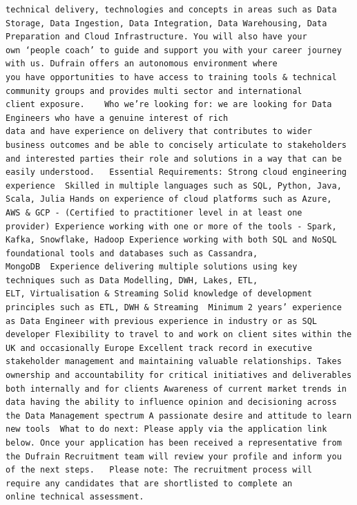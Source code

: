 \documentclass[
]{article}
\begin{document}
\begin{verbatim}
technical delivery, technologies and concepts in areas such as Data Storage, Data Ingestion, Data Integration, Data Warehousing, Data Preparation and Cloud Infrastructure. You will also have your own ‘people coach’ to guide and support you with your career journey with us. Dufrain offers an autonomous environment where you have opportunities to have access to training tools & technical community groups and provides multi sector and international client exposure.    Who we’re looking for: we are looking for Data Engineers who have a genuine interest of rich data and have experience on delivery that contributes to wider business outcomes and be able to concisely articulate to stakeholders and interested parties their role and solutions in a way that can be easily understood.   Essential Requirements: Strong cloud engineering experience  Skilled in multiple languages such as SQL, Python, Java, Scala, Julia Hands on experience of cloud platforms such as Azure, AWS & GCP - (Certified to practitioner level in at least one provider) Experience working with one or more of the tools - Spark, Kafka, Snowflake, Hadoop Experience working with both SQL and NoSQL foundational tools and databases such as Cassandra, MongoDB  Experience delivering multiple solutions using key techniques such as Data Modelling, DWH, Lakes, ETL, ELT, Virtualisation & Streaming Solid knowledge of development principles such as ETL, DWH & Streaming  Minimum 2 years’ experience as Data Engineer with previous experience in industry or as SQL developer Flexibility to travel to and work on client sites within the UK and occasionally Europe Excellent track record in executive stakeholder management and maintaining valuable relationships. Takes ownership and accountability for critical initiatives and deliverables both internally and for clients Awareness of current market trends in data having the ability to influence opinion and decisioning across the Data Management spectrum A passionate desire and attitude to learn new tools  What to do next: Please apply via the application link below. Once your application has been received a representative from the Dufrain Recruitment team will review your profile and inform you of the next steps.   Please note: The recruitment process will require any candidates that are shortlisted to complete an online technical assessment.

\end{verbatim}
\end{document}
